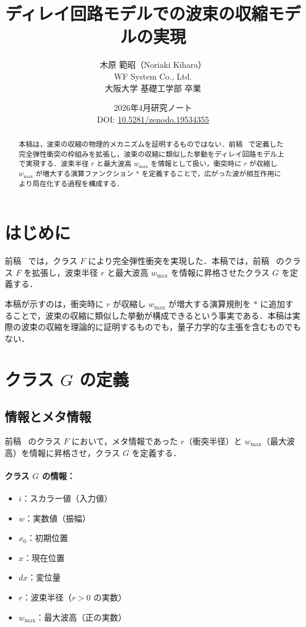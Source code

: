 \documentclass[12pt,a4paper]{ltjsarticle}
\title{ディレイ回路モデルでの波束の収縮モデルの実現}
\author{木原 範昭（Noriaki Kihara）\\
WF System Co., Ltd.\\
大阪大学 基礎工学部 卒業}
\date{2026年4月\quad 研究ノート\\[4pt]
DOI: \href{https://doi.org/10.5281/zenodo.19534355}{10.5281/zenodo.19534355}}
\begin{document}
\maketitle

\begin{abstract}
本稿は，波束の収縮の物理的メカニズムを証明するものではない．前稿~\cite{ref4} で定義した完全弾性衝突の枠組みを拡張し，波束の収縮に類似した挙動をディレイ回路モデル上で実現する．波束半径 $r$ と最大波高 $w_{\max}$ を情報として扱い，衝突時に $r$ が収縮し $w_{\max}$ が増大する演算ファンクション $*$ を定義することで，広がった波が相互作用により局在化する過程を構成する．
\end{abstract}

\section{はじめに}

前稿~\cite{ref4} では，クラス $F$ により完全弾性衝突を実現した．本稿では，前稿~\cite{ref4} のクラス $F$ を拡張し，波束半径 $r$ と最大波高 $w_{\max}$ を情報に昇格させたクラス $G$ を定義する．

本稿が示すのは，衝突時に $r$ が収縮し $w_{\max}$ が増大する演算規則を $*$ に追加することで，波束の収縮に類似した挙動が構成できるという事実である．本稿は実際の波束の収縮を理論的に証明するものでも，量子力学的な主張を含むものでもない．

\section{クラス $G$ の定義}

\subsection{情報とメタ情報}

前稿~\cite{ref4} のクラス $F$ において，メタ情報であった $r$（衝突半径）と $w_{\max}$（最大波高）を情報に昇格させ，クラス $G$ を定義する．

\paragraph{クラス $G$ の情報：}

\begin{itemize}
  \item $i$：スカラー値（入力値）
  \item $w$：実数値（振幅）
  \item $x_0$：初期位置
  \item $x$：現在位置
  \item $dx$：変位量
  \item $r$：波束半径（$r > 0$ の実数）
  \item $w_{\max}$：最大波高（正の実数）
\end{itemize}
\end{document}
